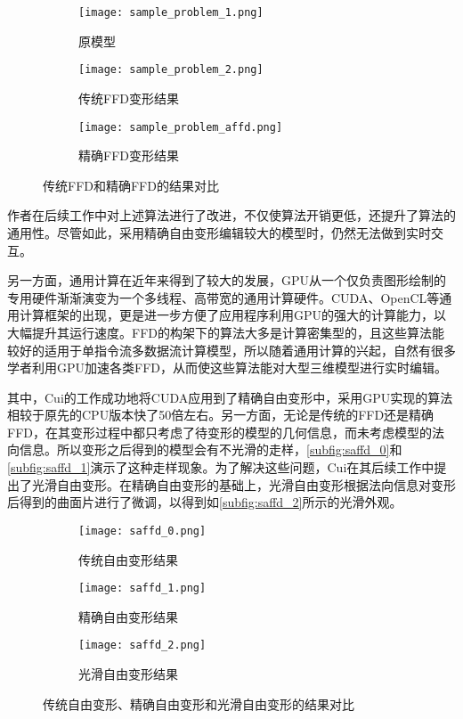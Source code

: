 \begin{figure}[htbp]
	\centering
	\begin{subfigure}[b]{.3\textwidth}
		\centering
		\texttt{[image: sample\_problem\_1.png]}
		\caption{原模型}
	\end{subfigure}
	\quad
	\begin{subfigure}[b]{.3\textwidth}
		\centering
		\texttt{[image: sample\_problem\_2.png]}
		\caption{传统FFD变形结果}
	\end{subfigure}
	\quad
	\begin{subfigure}[b]{.3\textwidth}
		\centering
		\texttt{[image: sample\_problem\_affd.png]}
		\caption{精确FFD变形结果}
	\end{subfigure}
    \caption{传统FFD和精确FFD的结果对比}\label{fig:sample_problem_affd}
\end{figure}

作者在后续工作\cite{Feng00, Feng02}中对上述算法进行了改进，不仅使算法开销更低，还提升了算法的通用性。尽管如此，采用精确自由变形编辑较大的模型时，仍然无法做到实时交互。

另一方面，通用计算在近年来得到了较大的发展，GPU从一个仅负责图形绘制的专用硬件渐渐演变为一个多线程、高带宽的通用计算硬件。CUDA、OpenCL等通用计算框架的出现，更是进一步方便了应用程序利用GPU的强大的计算能力，以大幅提升其运行速度。FFD的构架下的算法大多是计算密集型的，且这些算法能较好的适用于单指令流多数据流计算模型，所以随着通用计算的兴起，自然有很多学者利用GPU加速各类FFD，从而使这些算法能对大型三维模型进行实时编辑。

其中，Cui\cite{Cui13}的工作成功地将CUDA应用到了精确自由变形中，采用GPU实现的算法相较于原先的CPU版本快了50倍左右。另一方面，无论是传统的FFD还是精确FFD，在其变形过程中都只考虑了待变形的模型的几何信息，而未考虑模型的法向信息。所以变形之后得到的模型会有不光滑的走样，\autoref{subfig:saffd_0}和\autoref{subfig:saffd_1}演示了这种走样现象。为了解决这些问题，Cui在其后续工作\cite{Cui15}中提出了光滑自由变形。在精确自由变形的基础上，光滑自由变形根据法向信息对变形后得到的曲面片进行了微调，以得到如\autoref{subfig:saffd_2}所示的光滑外观。

\begin{figure}[htbp]
	\centering
	\begin{subfigure}[b]{.3\textwidth}
		\centering
		\texttt{[image: saffd\_0.png]}
		\caption{传统自由变形结果}\label{subfig:saffd_0}
	\end{subfigure}
	\quad
	\begin{subfigure}[b]{.3\textwidth}
		\centering
		\texttt{[image: saffd\_1.png]}
		\caption{精确自由变形结果}\label{subfig:saffd_1}
	\end{subfigure}
	\quad
	\begin{subfigure}[b]{.3\textwidth}
		\centering
		\texttt{[image: saffd\_2.png]}
		\caption{光滑自由变形结果}\label{subfig:saffd_2}
	\end{subfigure}
    \caption{传统自由变形、精确自由变形和光滑自由变形的结果对比}\label{fig:sample_problem_saffd}
\end{figure}


